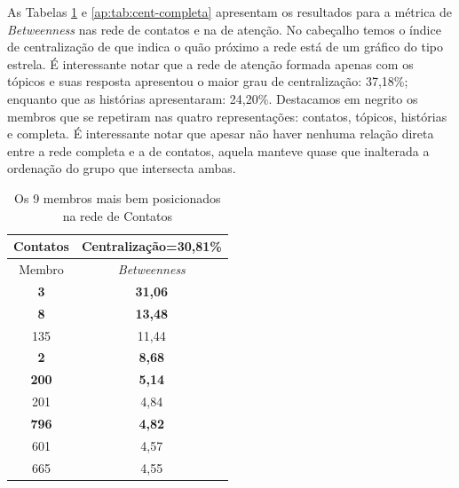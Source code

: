 As Tabelas \ref{ap:tab:cent-contatos} e \ref{ap:tab:cent-completa} apresentam os
resultados para a métrica de \emph{Betweenness} nas rede de contatos e na de
atenção. No cabeçalho temos o índice de centralização de
\citeauthor{Freeman1979} que indica o quão próximo a rede está de um gráfico do
tipo estrela. É interessante notar que a rede de atenção formada apenas com os
tópicos e suas resposta apresentou o maior grau de centralização: 37,18\%;
enquanto que as histórias apresentaram: 24,20\%. Destacamos em negrito os
membros que se repetiram nas quatro representações: contatos, tópicos, histórias
e completa. É interessante notar que apesar não haver nenhuma relação direta
entre a rede completa e a de contatos, aquela manteve quase que inalterada a
ordenação do grupo que intersecta ambas.

\begin{table}[htbp]
	\large       %
	\setlength{\arrayrulewidth}{2\arrayrulewidth}  %
	\setlength{\belowcaptionskip}{10pt}  %
	\caption{Os 9 membros mais bem posicionados na rede de Contatos} \centering   
	\begin{tabular}{| c | c |}
	\hline
	Contatos & Centralização=30,81\% \\ \hline\hline
	Membro & \emph{Betweenness} \\ \hline
	\textbf{3} & \textbf{31,06} \\
	\textbf{8} & \textbf{13,48} \\
	135 & 11,44 \\
	\textbf{2} & \textbf{8,68} \\
	\textbf{200} & \textbf{5,14} \\
	201 & 4,84 \\
	\textbf{796} & \textbf{4,82} \\
	601 & 4,57 \\
	665 & 4,55 \\ \hline
	\end{tabular}
	\label{ap:tab:cent-contatos}
\end{table}

